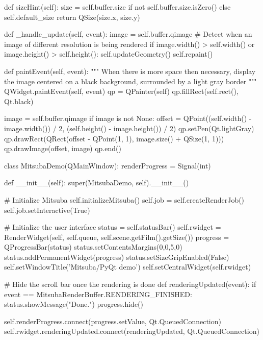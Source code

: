 \begin{python}
    def sizeHint(self):
        size = self.buffer.size if not self.buffer.size.isZero() else self.default_size
        return QSize(size.x, size.y)

    def _handle_update(self, event):
        image = self.buffer.qimage
        # Detect when an image of different resolution is being rendered
        if image.width() > self.width() or image.height() > self.height():
            self.updateGeometry()
        self.repaint()

    def paintEvent(self, event):
        """ When there is more space then necessary, display the image centered
            on a black background, surrounded by a light gray border """
        QWidget.paintEvent(self, event)
        qp = QPainter(self)
        qp.fillRect(self.rect(), Qt.black)

        image = self.buffer.qimage
        if image is not None:
            offset = QPoint((self.width() - image.width()) / 2,
                (self.height() - image.height()) / 2)
            qp.setPen(Qt.lightGray)
            qp.drawRect(QRect(offset - QPoint(1, 1), image.size() + QSize(1, 1)))
            qp.drawImage(offset, image)
        qp.end()

class MitsubaDemo(QMainWindow):
    renderProgress = Signal(int)

    def __init__(self):
        super(MitsubaDemo, self).__init__()

        # Initialize Mitsuba
        self.initializeMitsuba()
        self.job = self.createRenderJob()
        self.job.setInteractive(True)

        # Initialize the user interface
        status = self.statusBar()
        self.rwidget = RenderWidget(self, self.queue,
            self.scene.getFilm().getSize())
        progress = QProgressBar(status)
        status.setContentsMargins(0,0,5,0)
        status.addPermanentWidget(progress)
        status.setSizeGripEnabled(False)
        self.setWindowTitle('Mitsuba/PyQt demo')
        self.setCentralWidget(self.rwidget)

        # Hide the scroll bar once the rendering is done
        def renderingUpdated(event):
            if event == MitsubaRenderBuffer.RENDERING_FINISHED:
                status.showMessage("Done.")
                progress.hide()

        self.renderProgress.connect(progress.setValue, Qt.QueuedConnection)
        self.rwidget.renderingUpdated.connect(renderingUpdated,
            Qt.QueuedConnection)


\end{python}

